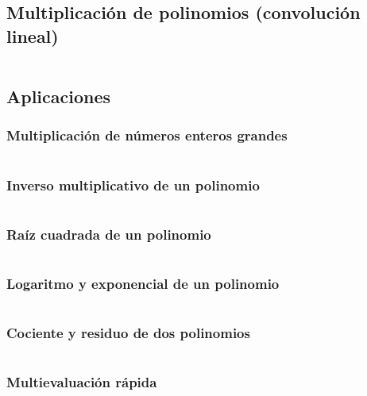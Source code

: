 \documentclass[11pt]{article}
\begin{document}
		\subsection{Multiplicación de polinomios (convolución lineal)}
		\inputminted[tabsize=2,breaklines,firstline=75,lastline=100,fontsize=\small]{c++}{fft.cpp}
		
		\subsection{Aplicaciones}
			\subsubsection{Multiplicación de números enteros grandes}
			\inputminted[tabsize=2,breaklines,firstline=102,lastline=135,fontsize=\small]{c++}{fft.cpp}
			
			\subsubsection{Inverso multiplicativo de un polinomio}
			\inputminted[tabsize=2,breaklines,firstline=137,lastline=158,fontsize=\small]{c++}{fft.cpp}
			
			\subsubsection{Raíz cuadrada de un polinomio}
			\inputminted[tabsize=2,breaklines,firstline=160,lastline=181,fontsize=\small]{c++}{fft.cpp}
			
			\subsubsection{Logaritmo y exponencial de un polinomio}
			\inputminted[tabsize=2,breaklines,firstline=183,lastline=225,fontsize=\small]{c++}{fft.cpp}
			
			\subsubsection{Cociente y residuo de dos polinomios}
			\inputminted[tabsize=2,breaklines,firstline=227,lastline=252,fontsize=\small]{c++}{fft.cpp}
			
			\subsubsection{Multievaluación rápida}
			\inputminted[tabsize=2,breaklines,firstline=254,lastline=294,fontsize=\small]{c++}{fft.cpp}
			
\end{document}
